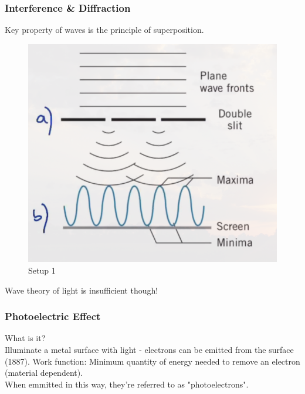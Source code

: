 \documentclass[class=article,crop=false]{standalone}
\begin{document}
\subsubsection{Interference \& Diffraction}
Key property of waves is the principle of superposition.\\


\begin{figure}[h]
	\centering
	\includegraphics[width=.7\linewidth]{./Images/double_slit.png}
	\caption{Setup 1}
\end{figure}

Wave theory of light is insufficient though!

\subsubsection{Photoelectric Effect}
What is it? \\
Illuminate a metal surface with light - electrons can be emitted from the surface (1887). Work function: Minimum quantity of energy needed to remove an electron (material dependent). \\
When emmitted in this way, they're referred to as "photoelectrons".
\end{document}
